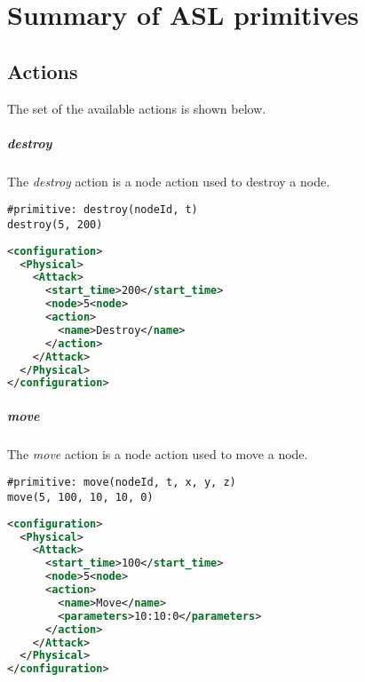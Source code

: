 

\chapter{Summary of ASL primitives}
\label{ch:asl-primitives}

\section{Actions}
The set of the available actions is shown below.

\paragraph{destroy}
The \emph{destroy} action is a node action used to destroy a node.
%
\begin{lstlisting}[language={asl}, caption={ASL destroy example}]
#primitive: destroy(nodeId, t)
destroy(5, 200)
\end{lstlisting}
%
\begin{lstlisting}[language={xml}, caption={Interpreter output}]
<configuration>
  <Physical>
    <Attack>
      <start_time>200</start_time>
      <node>5<node>
      <action>
        <name>Destroy</name>
      </action>
    </Attack>
  </Physical>
</configuration>
\end{lstlisting}

\paragraph{move}
The \emph{move} action is a node action used to move a node.
%
\begin{lstlisting}[language={asl},caption={ASL move example}]
#primitive: move(nodeId, t, x, y, z)
move(5, 100, 10, 10, 0)
\end{lstlisting}
%
\begin{lstlisting}[language={xml},caption={Interpreter output}]
<configuration>
  <Physical>
    <Attack>
      <start_time>100</start_time>
      <node>5<node>
      <action>
        <name>Move</name>
        <parameters>10:10:0</parameters>
      </action>
    </Attack>
  </Physical>
</configuration>
\end{lstlisting}


